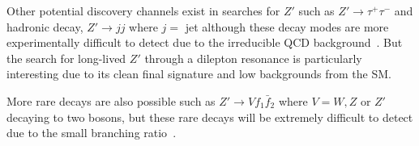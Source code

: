 Other potential discovery channels exist in searches for $Z'$ such as $Z' \rightarrow \tau^{+}\tau^{-}$ and hadronic decay, $Z' \rightarrow jj$ where $j =$ jet although these decay modes are more experimentally difficult to detect due to the irreducible QCD background~\cite{Aaboud:2017yvp}\cite{Sirunyan:2016iap}. But the search for long-lived $Z'$ through a dilepton resonance is particularly interesting due to its clean final signature and low backgrounds from the SM.

More rare decays are also possible such as $Z' \rightarrow V f_{1} \bar{f}_{2}$ where $V = W, Z$ or $Z'$ decaying to two bosons, but these rare decays will be extremely difficult to detect due to the small branching ratio~\cite{Langacker:2009su}.

